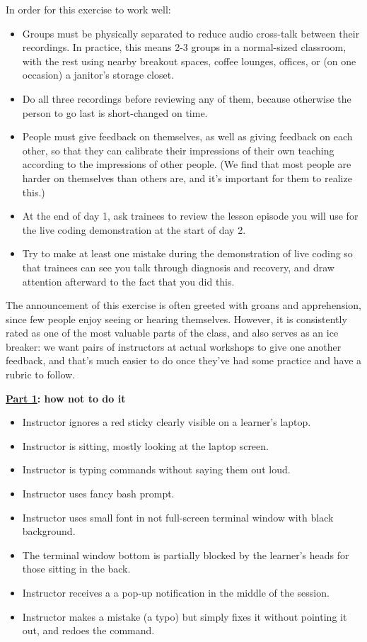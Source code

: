 In order for this exercise to work well:

\begin{itemize}
\item
  Groups must be physically separated to reduce audio cross-talk between
  their recordings. In practice, this means 2-3 groups in a normal-sized
  classroom, with the rest using nearby breakout spaces, coffee lounges,
  offices, or (on one occasion) a janitor's storage closet.
\item
  Do all three recordings before reviewing any of them, because
  otherwise the person to go last is short-changed on time.
\item
  People must give feedback on themselves, as well as giving feedback on
  each other, so that they can calibrate their impressions of their own
  teaching according to the impressions of other people. (We find that
  most people are harder on themselves than others are, and it's
  important for them to realize this.)
\item
  At the end of day 1, ask trainees to review the lesson episode you
  will use for the live coding demonstration at the start of day 2.
\item
  Try to make at least one mistake during the demonstration of live
  coding so that trainees can see you talk through diagnosis and
  recovery, and draw attention afterward to the fact that you did this.
\end{itemize}

The announcement of this exercise is often greeted with groans and
apprehension, since few people enjoy seeing or hearing themselves.
However, it is consistently rated as one of the most valuable parts of
the class, and also serves as an ice breaker: we want pairs of
instructors at actual workshops to give one another feedback, and that's
much easier to do once they've had some practice and have a rubric to
follow.


\textbf{\href{https://youtu.be/bXxBeNkKmJE}{Part 1}: how not to do it}

\begin{itemize}
\item
  Instructor ignores a red sticky clearly visible on a learner's laptop.
\item
  Instructor is sitting, mostly looking at the laptop screen.
\item
  Instructor is typing commands without saying them out loud.
\item
  Instructor uses fancy bash prompt.
\item
  Instructor uses small font in not full-screen terminal window with
  black background.
\item
  The terminal window bottom is partially blocked by the learner's heads
  for those sitting in the back.
\item
  Instructor receives a a pop-up notification in the middle of the
  session.
\item
  Instructor makes a mistake (a typo) but simply fixes it without
  pointing it out, and redoes the command.
\end{itemize}

